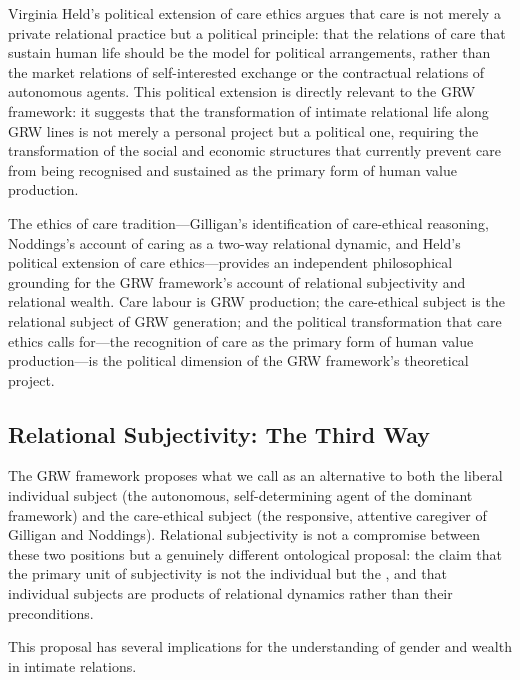 Virginia Held's political extension of care ethics \parencite{held2006} argues that care is not merely a private relational practice but a political principle: that the relations of care that sustain human life should be the model for political arrangements, rather than the market relations of self-interested exchange or the contractual relations of autonomous agents. This political extension is directly relevant to the GRW framework: it suggests that the transformation of intimate relational life along GRW lines is not merely a personal project but a political one, requiring the transformation of the social and economic structures that currently prevent care from being recognised and sustained as the primary form of human value production.

\begin{claim}
The ethics of care tradition---Gilligan's identification of care-ethical reasoning, Noddings's account of caring as a two-way relational dynamic, and Held's political extension of care ethics---provides an independent philosophical grounding for the GRW framework's account of relational subjectivity and relational wealth. Care labour is GRW production; the care-ethical subject is the relational subject of GRW generation; and the political transformation that care ethics calls for---the recognition of care as the primary form of human value production---is the political dimension of the GRW framework's theoretical project.
\end{claim}

\subsection{Relational Subjectivity: The Third Way}
\label{p15:subsec:relational_subjectivity}

\noindent
The GRW framework proposes what we call  as an alternative to both the liberal individual subject (the autonomous, self-determining agent of the dominant framework) and the care-ethical subject (the responsive, attentive caregiver of Gilligan and Noddings). Relational subjectivity is not a compromise between these two positions but a genuinely different ontological proposal: the claim that the primary unit of subjectivity is not the individual but the , and that individual subjects are products of relational dynamics rather than their preconditions.

This proposal has several implications for the understanding of gender and wealth in intimate relations.

